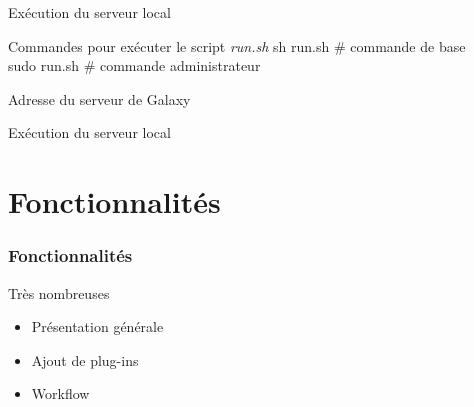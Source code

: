 \documentclass[12pt]{beamer}
\begin{document}
\begin{frame}{Exécution du serveur local}
\begin{block}{Commandes pour exécuter le script \textit{run.sh}}
sh run.sh   \# commande de base\\
sudo run.sh   \# commande administrateur\\
\end{block}
\begin{block}{Adresse du serveur de Galaxy}
\scriptsize
{}
\end{block}
\end{frame}

\begin{frame}{Exécution du serveur local}
\scriptsize
{}
\end{frame}

\section{Fonctionnalités}
\begin{frame}
\frametitle{Fonctionnalités}
\begin{block}{Très nombreuses}
\begin{itemize}
\pause
\item Présentation générale
\item Ajout de plug-ins
\item Workflow
\end{itemize}
\end{block}
\end{frame}
\end{document}
